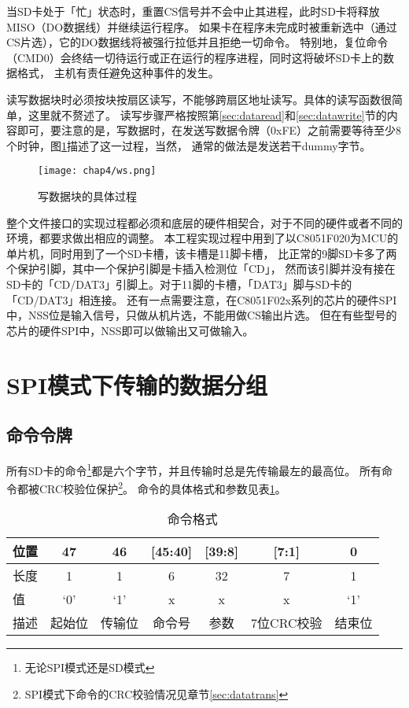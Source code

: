当SD卡处于「忙」状态时，重置CS信号并不会中止其进程，此时SD卡将释放MISO（DO数据线）并继续运行程序。
如果卡在程序未完成时被重新选中（通过CS片选），它的DO数据线将被强行拉低并且拒绝一切命令。
特别地，复位命令（CMD0）会终结一切待运行或正在运行的程序进程，同时这将破坏SD卡上的数据格式，
主机有责任避免这种事件的发生。

读写数据块时必须按块按扇区读写，不能够跨扇区地址读写。具体的读写函数很简单，这里就不赘述了。
读写步骤严格按照第\ref{sec:dataread}和\ref{sec:datawrite}节的内容即可，要注意的是，写数据时，在发送写数据令牌（0xFE）之前需要等待至少8个时钟，图\ref{fig:ws}描述了这一过程，当然，
通常的做法是发送若干dummy字节。
\begin{figure}[!htb]
    \centering
    \texttt{[image: chap4/ws.png]}
    \\
    \caption{写数据块的具体过程}\label{fig:ws}
\end{figure}

整个文件接口的实现过程都必须和底层的硬件相契合，对于不同的硬件或者不同的环境，都要求做出相应的调整。
本工程实现过程中用到了以C8051F020为MCU的单片机，同时用到了一个SD卡槽，该卡槽是11脚卡槽，
比正常的9脚SD卡多了两个保护引脚，其中一个保护引脚是卡插入检测位「CD」，
然而该引脚并没有接在SD卡的「CD/DAT3」引脚上。对于11脚的卡槽，「DAT3」脚与SD卡的「CD/DAT3」相连接。
还有一点需要注意，在C8051F02x系列的芯片的硬件SPI中，NSS位是输入信号，只做从机片选，不能用做CS输出片选。
但在有些型号的芯片的硬件SPI中，NSS即可以做输出又可做输入。


\section{SPI模式下传输的数据分组}
\label{sec:spipack}

\subsection{命令令牌}
\label{sec:cmdtoken}

所有SD卡的命令\footnote{无论SPI模式还是SD模式}都是六个字节，并且传输时总是先传输最左的最高位。
所有命令都被CRC校验位保护\footnote{SPI模式下命令的CRC校验情况见章节\ref{sec:datatrans}}。
命令的具体格式和参数见表\ref{tab:cmdfmt}。
\begin{table}[!htb]
    \centering
    \caption{命令格式} \label{tab:cmdfmt}
    \begin{tabular}{l*{6}{c}}
        \toprule
        位置 & 47 & 46 & [45:40] & [39:8] & [7:1] & 0 \\ \midrule
        长度 & 1 & 1 & 6 & 32 & 7 & 1 \\ \midrule
        值 & `0' & `1' & x & x & x & `1' \\ \midrule
        描述 & 起始位 & 传输位 & 命令号 & 参数 & 7位CRC校验 & 结束位 \\
        \bottomrule
    \end{tabular}
\end{table}

